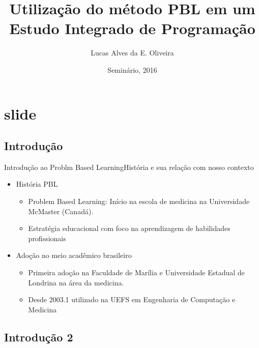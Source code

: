 \documentclass{beamer}
\title{Utilização do método PBL em um Estudo Integrado de Programação}
\author{Lucas Alves da E. Oliveira\inst{1}}
\institute[Universidade Estadual de Feira de Santana] %
{
  \inst{1}%
  Departmento de Ciências Exatas\\
  Universidade Estadual de Feira de Santana
  }
\date{Seminário, 2016}
\begin{document}
\begin{frame}
  \titlepage
\end{frame}


\section{slide}

\subsection{Introdução}

\begin{frame}{Introdução ao Problm Based Learning}{História e sua relação com nosso contexto}
  \begin{itemize}
    \item História PBL
    \begin{itemize}
        \item \alert{Problem Based Learning}: Início na escola de medicina na Universidade McMaster (Canadá).
        \item Estratégia educacional com foco na aprendizagem de habilidades profissionais
    \end{itemize} 
    \item Adoção no meio acadêmico brasileiro
    \begin{itemize}
        \item Primeira adoção na Faculdade de Marília e Universidade Estadual de Londrina na área da medicina.
        \item Desde 2003.1 utilizado na UEFS em Engenharia de Computação e Medicina
    \end{itemize}
  \end{itemize}
\end{frame}

\subsection{Introdução 2}
\end{document}
